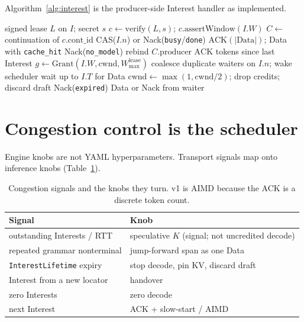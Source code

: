 \documentclass{article}
\theoremstyle{definition}
\newcommand{\cwnd}{\mathrm{cwnd}}
\begin{document}
Algorithm~\ref{alg:interest} is the producer-side Interest handler as implemented.

\begin{algorithm}[t]
\caption{HandleInterest($I$): CAS, credit, wait for Data or Nack.}
\label{alg:interest}
\begin{algorithmic}[1]
\Require signed lease $L$ on $I$; secret $s$
\State $c \gets \mathrm{verify}(L, s)$; $c.\mathrm{assertWindow}(I.W)$
\State $C \gets$ continuation of $c.\mathrm{cont\_id}$
  \State \Return CAS($I.n$) or Nack(\texttt{busy}/\texttt{done})
\EndIf
{}
  \State $\mathrm{ACK}(\lvert \mathrm{Data} \rvert)$; \Return Data with \texttt{cache\_hit}
\EndIf
{}
  \State \Return Nack(\texttt{no\_model})
\EndIf
{}
  \State rebind $C.\mathrm{producer}$ 
\EndIf
\State $\mathrm{ACK}$ tokens since last Interest
\State $g \gets \mathrm{Grant}(I.W, \cwnd, W_{\max}^{\mathrm{lease}})$
\State coalesce duplicate waiters on $I.n$; wake scheduler
\State wait up to $I.T$ for Data
  \State $\cwnd \gets \max(1, \cwnd/2)$; drop credits; discard draft
  \State \Return Nack(\texttt{expired})
\EndIf
\State \Return Data or Nack from waiter
\end{algorithmic}
\end{algorithm}

\section{Congestion control is the scheduler}
\label{sec:cc}

Engine knobs are not YAML hyperparameters.
Transport signals map onto inference knobs (Table~\ref{tab:map}).

\begin{table}[t]
\centering
\small
\caption{Congestion signals and the knobs they turn. v1 is AIMD because the ACK is a discrete token count.}
\label{tab:map}
\begin{tabular}{ll}
\toprule
Signal & Knob \\
\midrule
outstanding Interests / RTT & speculative $K$ (signal; not uncredited decode) \\
repeated grammar nonterminal & jump-forward span as one Data \\
\texttt{InterestLifetime} expiry & stop decode, pin KV, discard draft \\
Interest from a new locator & handover \\
zero Interests & zero decode \\
next Interest & ACK + slow-start / AIMD \\
\bottomrule
\end{tabular}
\end{table}
\end{document}
